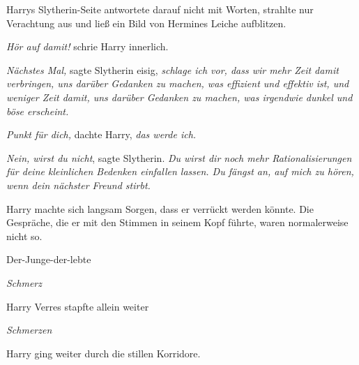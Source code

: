 Harrys Slytherin-Seite antwortete darauf nicht mit Worten, strahlte nur Verachtung aus und ließ ein Bild von Hermines Leiche aufblitzen.

\emph{Hör auf damit!} schrie Harry innerlich.

\emph{Nächstes Mal,} sagte Slytherin eisig, \emph{schlage ich vor, dass wir mehr Zeit damit verbringen, uns darüber Gedanken zu machen, was effizient und effektiv ist, und weniger Zeit damit, uns darüber Gedanken zu machen, was irgendwie dunkel und böse erscheint.}

\emph{Punkt für dich,} dachte Harry, \emph{das werde ich.}

\emph{Nein, wirst du nicht}, sagte Slytherin. \emph{Du wirst dir noch mehr Rationalisierungen für deine kleinlichen Bedenken einfallen lassen. Du fängst an, auf mich zu hören, wenn dein \emph{nächster} Freund stirbt.}

Harry machte sich langsam Sorgen, dass er verrückt werden könnte. Die Gespräche, die er mit den Stimmen in seinem Kopf führte, waren normalerweise nicht so.

Der-Junge-der-lebte

\emph{Schmerz}

Harry Verres stapfte allein weiter

\emph{Schmerzen}

Harry ging weiter durch die stillen Korridore.

\later

